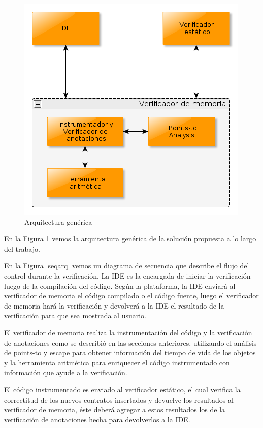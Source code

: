 \documentclass[12pt,a4paper]{article}
\begin{document}
			\begin{figure}[htb]
			\begin{center}
			\includegraphics[scale=0.5]{arqgeneral.png}
			\end{center}
			\caption{Arquitectura genérica}
			\label{arqgen}
			\end{figure}

			En la Figura \ref{arqgen} vemos la arquitectura genérica de la solución propuesta a lo largo del trabajo.

			En la Figura \ref{seqarq} vemos un diagrama de secuencia que describe el flujo del control durante la verificación. La IDE es la encargada de iniciar la verificación luego de la compilación del código. Según la plataforma, la IDE enviará al verificador de memoria el código compilado o el código fuente, luego el verificador de memoria hará la verificación y devolverá a la IDE el resultado de la verificación para que sea mostrada al usuario.

			El verificador de memoria realiza la instrumentación del código y la verificación de anotaciones como se describió en las secciones anteriores, utilizando el análisis de points-to y escape para obtener información del tiempo de vida de los objetos y la herramienta aritmética para enriquecer el código instrumentado con información que ayude a la verificación.

			El código instrumentado es enviado al verificador estático, el cual verifica la correctitud de los nuevos contratos insertados y devuelve los resultados al verificador de memoria, éste deberá agregar a estos resultados los de la verificación de anotaciones hecha para devolverlos a la IDE.
\end{document}
